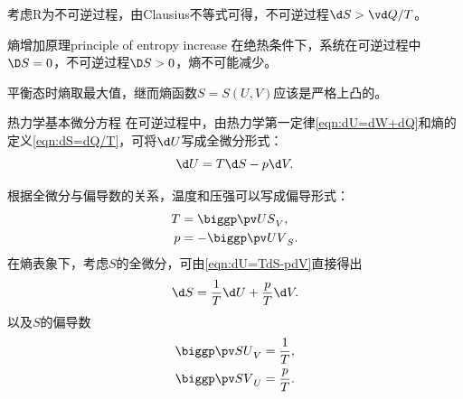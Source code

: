 \begin{corollary}
	考虑R为不可逆过程，由Clausius不等式可得，不可逆过程$\d S>\vd Q/T$。
\end{corollary}

\begin{theorem}
	{熵增加原理}{principle of entropy increase}
	在绝热条件下，系统在可逆过程中$\D S=0$，不可逆过程$\D S>0$，熵不可能减少。
\end{theorem}

\begin{corollary}
	平衡态时熵取最大值，继而熵函数$S=S(U,V)$应该是严格上凸的。
\end{corollary}




\begin{theorem}
	{热力学基本微分方程}{}
	在可逆过程中，由热力学第一定律\eqref{eqn:dU=dW+dQ}和熵的定义\eqref{eqn:dS=dQ/T}，可将$\d U$写成全微分形式：
	\begin{equation}
		\label{eqn:dU=TdS-pdV}
		\d U=T\d S-p\d V.
	\end{equation}
\end{theorem}

\begin{corollary}
	根据全微分与偏导数的关系，温度和压强可以写成偏导形式：
	\begin{subequations}
		\begin{align}
			T&=\pu[V]US,\\
			p&=-\pu[S]UV.
		\end{align}
	\end{subequations}
	在熵表象下，考虑$S$的全微分，可由\eqref{eqn:dU=TdS-pdV}直接得出
	\begin{equation}
		\d S=\frac1T\d U+\frac pT\d V.
	\end{equation}
	以及$S$的偏导数
	\begin{subequations}
		\begin{align}
			\pu[V]SU&=\frac1T,\\
			\pu[U]SV&=\frac pT.
		\end{align}
	\end{subequations}
\end{corollary}


